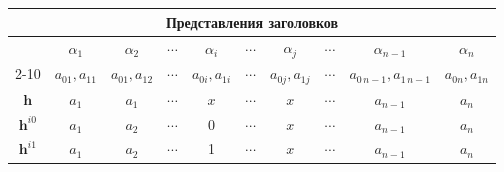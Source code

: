 {\small

\begin{center}

\tabcolsep=4pt

\begin{tabular}{|c|c|c|c|c|c|c|c|c|c|}

\multicolumn{10}{c}{Представления заголовков}\\[2ex]

\hline

& \cellcolor[gray]{.85}$\alpha_1$ & \cellcolor[gray]{.85}$\alpha_2$ & \cellcolor[gray]{.85}$\cdots$ &

\cellcolor[gray]{.85}$\alpha_i$ & \cellcolor[gray]{.85}$\cdots$ & \cellcolor[gray]{.85}$\alpha_j$ &

\cellcolor[gray]{.85}$\cdots$ & 

\cellcolor[gray]{.85}$\alpha_{n-1}$ & \cellcolor[gray]{.85}$\alpha_n$\\

\cline{2-10}

\cline{2-10}

\cline{2-10}

& \cellcolor[gray]{.85}$a_{01}, a_{11}$ &\cellcolor[gray]{.85}$a_{01}, a_{12}$ & 

\cellcolor[gray]{.85}$\cdots$ & \cellcolor[gray]{.85}$a_{0i},a_{1i}$ & 

\cellcolor[gray]{.85}$\cdots $& \cellcolor[gray]{.85}$a_{0j},a_{1j}$ & 

\cellcolor[gray]{.85}$\cdots$ & \cellcolor[gray]{.85}$a_{0\,n-1},a_{1\,n-1}$ & 

\cellcolor[gray]{.85}$a_{0n},a_{1n}$\\

\hline

\cellcolor[gray]{.85}$\mathbf{h}$ & $a_1$ &$a_1$  &$\cdots$ & $x$ & $\cdots$ & $x$ & $\cdots$ & $a_{n-1}$ & 

$a_n$\\


\cellcolor[gray]{.85}$\mathbf{h}^{i0}$ & $a_1$ & $a_2$ & $\cdots$ & 0 & $\cdots$ & $x$ & $\cdots$ & 

$a_{n-1}$ & $a_n$\\


\cellcolor[gray]{.85}$\mathbf{h}^{i1}$ & $a_1$ & $a_2$ & $\cdots$ & 1 & $\cdots$ & $x$ & $\cdots$ & 

$a_{n-1}$ & $a_n$\\


\end{tabular}
\end{center}}
